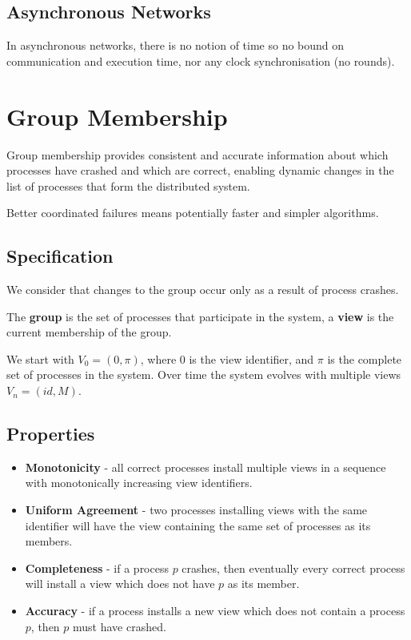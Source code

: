 \documentclass[11pt]{article}
\begin{document}
\subsection{Asynchronous Networks}
In asynchronous networks, there is no notion of time so no bound on communication and execution time, nor any clock synchronisation (no rounds).

\section{Group Membership}
Group membership provides consistent and accurate information about which processes have crashed and which are correct, enabling dynamic changes in the list of processes that form the distributed system.

Better coordinated failures means potentially faster and simpler algorithms.

\subsection{Specification}
We consider that changes to the group occur only as a result of process crashes.

The \textbf{group} is the set of processes that participate in the system, a \textbf{view} is the current membership of the group.

We start with $V_0 = (0, \pi)$, where $0$ is the view identifier, and $\pi$ is the complete set of processes in the system.
Over time the system evolves with multiple views $V_n = (id, M)$.

\subsection{Properties}
\begin{itemize}
  \item \textbf{Monotonicity} - all correct processes install multiple views in a sequence  with monotonically increasing view identifiers.
  \item \textbf{Uniform Agreement} - two processes installing views with the same identifier will have the view containing the same set of processes as its members.
  \item \textbf{Completeness} - if a process $p$ crashes, then eventually every correct process will install a view which does not have $p$ as its member.
  \item \textbf{Accuracy} - if a process installs a new view which does not contain a process $p$, then $p$ must have crashed.
\end{itemize}
\end{document}
